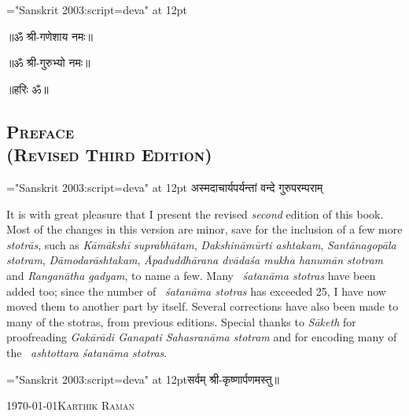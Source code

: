 {\font \x="Sanskrit 2003:script=deva" at 12pt\x
\centerline{॥ॐ श्री-गणेशाय नमः॥}
\centerline{॥ॐ श्री-गुरुभ्यो नमः॥}
\centerline{॥हरिः ॐ॥}
}
\thispagestyle{empty}

\begin{center}
\chapter*{\texorpdfstring{\scshape{Preface\\(Revised Third Edition)}}{Preface\\(Revised Third Edition)}}
\end{center}

{\font \x="Sanskrit 2003:script=deva" at 12pt\x
{}
{अस्मदाचार्यपर्यन्तां वन्दे गुरुपरम्पराम्}
}

It is with great pleasure that I present the revised \emph{second} edition of this book. Most of the changes in this version are minor, save for the inclusion of a few more \emph{stotrās}, such as \textit{Kāmākshī suprabhātam}, \textit{Dakshināmūrti ashtakam}, \textit{Santānagopāla stotram}, \textit{Dāmodarāshtakam}, \textit{Āpaduddhārana  dvādaśa mukha hanu\-mān stotram} and \textit{Ranganātha gadyam}, to name a few. Many ~\textit{śatanāma stotras} have been added too; since the number of ~\textit{śatanāma stotras} has exceeded 25, I have now moved them to another part by itself. Several corrections have also been made to many of the stotras, from previous editions. Special thanks to \textit{Sāketh} for proofreading \textit{Gakārādi Ganapati Sahasranāma stotram} and for encoding many of the ~\textit{ashtottara śatanāma stotras}.\\



\centerline{\font \x="Sanskrit 2003:script=deva" at 12pt\x सर्वम् श्री-कृष्णार्पणमस्तु॥}

\medskip
\noindent\today \hfill \textsc{Karthik Raman}
